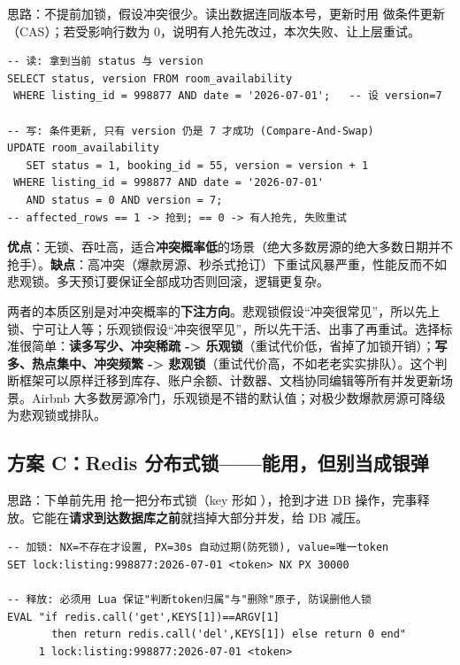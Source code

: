 思路：不提前加锁，假设冲突很少。读出数据连同版本号，更新时用  做条件更新（CAS）；若受影响行数为 0，说明有人抢先改过，本次失败、让上层重试。

\begin{lstlisting}
-- 读: 拿到当前 status 与 version
SELECT status, version FROM room_availability
 WHERE listing_id = 998877 AND date = '2026-07-01';   -- 设 version=7

-- 写: 条件更新, 只有 version 仍是 7 才成功 (Compare-And-Swap)
UPDATE room_availability
   SET status = 1, booking_id = 55, version = version + 1
 WHERE listing_id = 998877 AND date = '2026-07-01'
   AND status = 0 AND version = 7;
-- affected_rows == 1 -> 抢到; == 0 -> 有人抢先, 失败重试
\end{lstlisting}

\textbf{优点}：无锁、吞吐高，适合\textbf{冲突概率低}的场景（绝大多数房源的绝大多数日期并不抢手）。\textbf{缺点}：高冲突（爆款房源、秒杀式抢订）下重试风暴严重，性能反而不如悲观锁。多天预订要保证全部成功否则回滚，逻辑更复杂。

\begin{idea}
两者的本质区别是对冲突概率的\textbf{下注方向}。悲观锁假设“冲突很常见”，所以先上锁、宁可让人等；乐观锁假设“冲突很罕见”，所以先干活、出事了再重试。选择标准很简单：\textbf{读多写少、冲突稀疏 -> 乐观锁}（重试代价低，省掉了加锁开销）；\textbf{写多、热点集中、冲突频繁 -> 悲观锁}（重试代价高，不如老老实实排队）。这个判断框架可以原样迁移到库存、账户余额、计数器、文档协同编辑等所有并发更新场景。Airbnb 大多数房源冷门，乐观锁是不错的默认值；对极少数爆款房源可降级为悲观锁或排队。
\end{idea}

\subsection{方案 C：Redis 分布式锁——能用，但别当成银弹}

思路：下单前先用  抢一把分布式锁（key 形如 ），抢到才进 DB 操作，完事释放。它能在\textbf{请求到达数据库之前}就挡掉大部分并发，给 DB 减压。

\begin{lstlisting}
-- 加锁: NX=不存在才设置, PX=30s 自动过期(防死锁), value=唯一token
SET lock:listing:998877:2026-07-01 <token> NX PX 30000

-- 释放: 必须用 Lua 保证"判断token归属"与"删除"原子, 防误删他人锁
EVAL "if redis.call('get',KEYS[1])==ARGV[1]
       then return redis.call('del',KEYS[1]) else return 0 end"
     1 lock:listing:998877:2026-07-01 <token>
\end{lstlisting}

